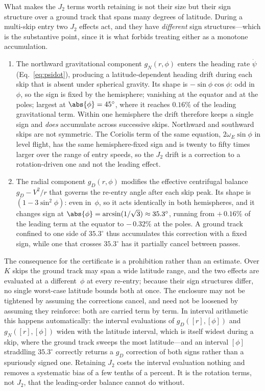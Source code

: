 \begin{remark}\label{rem:j2-skip}
What makes the $J_2$ terms worth retaining is not their size but their sign
structure over a ground track that spans many degrees of latitude. During
a multi-skip entry two $J_2$ effects act, and they have \emph{different}
sign structures---which is the substantive point, since it is what forbids
treating either as a monotone accumulation.
\begin{enumerate}
  \item The northward gravitational component $g_N(r,\phi)$ enters the
    heading rate $\dot\psi$ (Eq.~\ref{eq:psidot}), producing a
    latitude-dependent heading drift during each skip that is absent under
    spherical gravity. Its shape is $-\sin\phi\cos\phi$: odd in~$\phi$, so
    the sign is fixed by the hemisphere; vanishing at the equator and at
    the poles; largest at $\abs{\phi} = 45^\circ$, where it reaches
    $0.16\%$ of the leading gravitational term. Within one hemisphere the
    drift therefore keeps a single sign and \emph{does} accumulate across
    successive skips. Northward and southward skips are not symmetric. The
    Coriolis term of the same equation, $2\omega_E\sin\phi$ in level
    flight, has the same hemisphere-fixed sign and is twenty to fifty times
    larger over the range of entry speeds, so the $J_2$ drift is a
    correction to a rotation-driven one and not the leading effect.
  \item The radial component $g_D(r,\phi)$ modifies the effective
    centrifugal balance $g_D - V^2/r$ that governs the re-entry angle after
    each skip peak. Its shape is $(1-3\sin^2\!\phi)$: even in~$\phi$, so it
    acts identically in both hemispheres, and it changes sign at
    $\abs{\phi} = \arcsin(1/\sqrt{3}) \approx 35.3^\circ$, running from
    ${+}\,0.16\%$ of the leading term at the equator to ${-}\,0.32\%$ at
    the poles. A ground track confined to one side of $35.3^\circ$ thus
    accumulates this correction with a fixed sign, while one that crosses
    $35.3^\circ$ has it partially cancel between passes.
\end{enumerate}
The consequence for the certificate is a prohibition rather than an
estimate. Over $K$ skips the ground track may span a wide latitude range,
and the two effects are evaluated at a different~$\phi$ at every
re-entry; because their sign structures differ, no single worst-case
latitude bounds both at once. The enclosure may not be tightened by
assuming the corrections cancel, and need not be loosened by assuming they
reinforce: both are carried term by term. In interval arithmetic this
happens automatically: the interval evaluations of $g_D([r],[\phi])$ and
$g_N([r],[\phi])$ widen with the latitude interval, which is itself widest
during a skip, where the ground track sweeps the most latitude---and an
interval $[\phi]$ straddling $35.3^\circ$ correctly returns a $g_D$
correction of both signs rather than a spuriously signed one. Retaining
$J_2$ costs the interval evaluation nothing and removes a systematic bias of
a few tenths of a percent. It is the rotation terms, not $J_2$, that the
leading-order balance cannot do without.
\end{remark}


